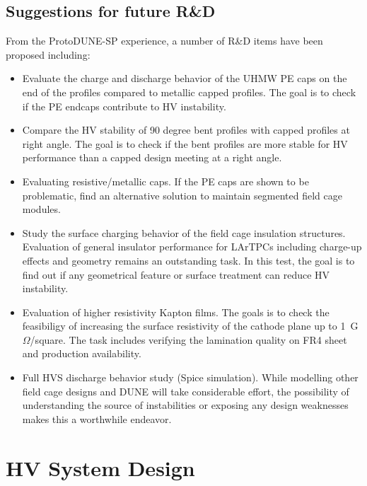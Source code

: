 
\subsection{Suggestions for future R\&D}
\label{sec:fdsp-hv-protodune-RD}
From the ProtoDUNE-SP experience, a number of R\&D items have been proposed including:
\begin{itemize}
\item Evaluate the charge and discharge behavior of the UHMW PE caps on the end of the profiles compared to metallic capped profiles.  The goal is to check if the PE endcaps contribute to HV instability.
\item Compare the HV stability of 90 degree bent profiles with capped profiles at right angle.  The goal is to check if the bent profiles are more stable for HV performance than a capped design meeting at a right angle.
\item Evaluating resistive/metallic caps.  If the PE caps are shown to be problematic, find an alternative solution to maintain segmented field cage modules.
\item Study the surface charging behavior of the field cage insulation structures.  Evaluation of general insulator performance for LArTPCs including charge-up effects and geometry remains an outstanding task.  In this test, the goal is to find out if any geometrical feature or surface treatment can reduce HV instability.
\item Evaluation of higher resistivity Kapton films.  The goals is to check the feasibiligy of increasing the surface resistivity of the cathode plane up to 1~G$\Omega$/square.  The task includes verifying the lamination quality on FR4 sheet and production availability.
\item Full HVS discharge behavior study (Spice simulation).  While modelling other field cage designs and DUNE will take considerable effort, the possibility of understanding the source of instabilities or exposing any design weaknesses makes this a worthwhile endeavor.
\end{itemize}
\clearpage


\section{HV System Design}
\label{sec:fdsp-hv-design}

